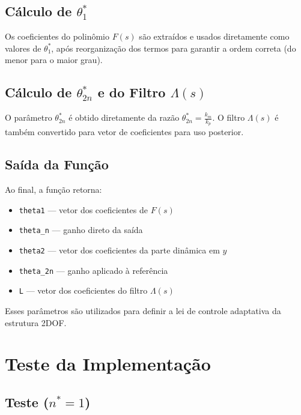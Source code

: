 \documentclass[10pt]{article}
\begin{document}
\subsection{Cálculo de \(\theta_1^*\)}

Os coeficientes do polinômio \( F(s) \) são extraídos e usados diretamente como valores de \( \theta_1^* \), após reorganização dos termos para garantir a ordem correta (do menor para o maior grau).

\subsection{Cálculo de \(\theta_{2n}^*\) e do Filtro \(\Lambda(s)\)}

O parâmetro \( \theta_{2n}^* \) é obtido diretamente da razão \( \theta_{2n}^* = \frac{k_m}{k_p} \). O filtro \( \Lambda(s) \) é também convertido para vetor de coeficientes para uso posterior.

\subsection{Saída da Função}

Ao final, a função retorna:

\begin{itemize}
    \item \texttt{theta1} — vetor dos coeficientes de \( F(s) \)
    \item \texttt{theta\_n} — ganho direto da saída
    \item \texttt{theta2} — vetor dos coeficientes da parte dinâmica em \( y \)
    \item \texttt{theta\_2n} — ganho aplicado à referência
    \item \texttt{L} — vetor dos coeficientes do filtro \( \Lambda(s) \)
\end{itemize}

Esses parâmetros são utilizados para definir a lei de controle adaptativa da estrutura 2DOF.



\newpage

\section{Teste da Implementação}

\subsection{Teste (\texorpdfstring{$n^* = 1$}{n*=1})}
\end{document}
